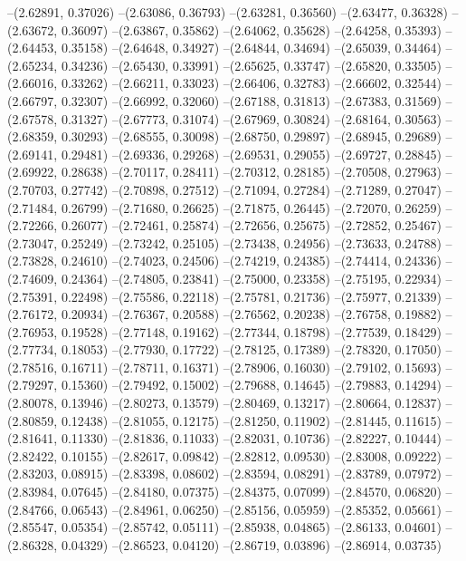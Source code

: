 --(2.62891, 0.37026)
--(2.63086, 0.36793)
--(2.63281, 0.36560)
--(2.63477, 0.36328)
--(2.63672, 0.36097)
--(2.63867, 0.35862)
--(2.64062, 0.35628)
--(2.64258, 0.35393)
--(2.64453, 0.35158)
--(2.64648, 0.34927)
--(2.64844, 0.34694)
--(2.65039, 0.34464)
--(2.65234, 0.34236)
--(2.65430, 0.33991)
--(2.65625, 0.33747)
--(2.65820, 0.33505)
--(2.66016, 0.33262)
--(2.66211, 0.33023)
--(2.66406, 0.32783)
--(2.66602, 0.32544)
--(2.66797, 0.32307)
--(2.66992, 0.32060)
--(2.67188, 0.31813)
--(2.67383, 0.31569)
--(2.67578, 0.31327)
--(2.67773, 0.31074)
--(2.67969, 0.30824)
--(2.68164, 0.30563)
--(2.68359, 0.30293)
--(2.68555, 0.30098)
--(2.68750, 0.29897)
--(2.68945, 0.29689)
--(2.69141, 0.29481)
--(2.69336, 0.29268)
--(2.69531, 0.29055)
--(2.69727, 0.28845)
--(2.69922, 0.28638)
--(2.70117, 0.28411)
--(2.70312, 0.28185)
--(2.70508, 0.27963)
--(2.70703, 0.27742)
--(2.70898, 0.27512)
--(2.71094, 0.27284)
--(2.71289, 0.27047)
--(2.71484, 0.26799)
--(2.71680, 0.26625)
--(2.71875, 0.26445)
--(2.72070, 0.26259)
--(2.72266, 0.26077)
--(2.72461, 0.25874)
--(2.72656, 0.25675)
--(2.72852, 0.25467)
--(2.73047, 0.25249)
--(2.73242, 0.25105)
--(2.73438, 0.24956)
--(2.73633, 0.24788)
--(2.73828, 0.24610)
--(2.74023, 0.24506)
--(2.74219, 0.24385)
--(2.74414, 0.24336)
--(2.74609, 0.24364)
--(2.74805, 0.23841)
--(2.75000, 0.23358)
--(2.75195, 0.22934)
--(2.75391, 0.22498)
--(2.75586, 0.22118)
--(2.75781, 0.21736)
--(2.75977, 0.21339)
--(2.76172, 0.20934)
--(2.76367, 0.20588)
--(2.76562, 0.20238)
--(2.76758, 0.19882)
--(2.76953, 0.19528)
--(2.77148, 0.19162)
--(2.77344, 0.18798)
--(2.77539, 0.18429)
--(2.77734, 0.18053)
--(2.77930, 0.17722)
--(2.78125, 0.17389)
--(2.78320, 0.17050)
--(2.78516, 0.16711)
--(2.78711, 0.16371)
--(2.78906, 0.16030)
--(2.79102, 0.15693)
--(2.79297, 0.15360)
--(2.79492, 0.15002)
--(2.79688, 0.14645)
--(2.79883, 0.14294)
--(2.80078, 0.13946)
--(2.80273, 0.13579)
--(2.80469, 0.13217)
--(2.80664, 0.12837)
--(2.80859, 0.12438)
--(2.81055, 0.12175)
--(2.81250, 0.11902)
--(2.81445, 0.11615)
--(2.81641, 0.11330)
--(2.81836, 0.11033)
--(2.82031, 0.10736)
--(2.82227, 0.10444)
--(2.82422, 0.10155)
--(2.82617, 0.09842)
--(2.82812, 0.09530)
--(2.83008, 0.09222)
--(2.83203, 0.08915)
--(2.83398, 0.08602)
--(2.83594, 0.08291)
--(2.83789, 0.07972)
--(2.83984, 0.07645)
--(2.84180, 0.07375)
--(2.84375, 0.07099)
--(2.84570, 0.06820)
--(2.84766, 0.06543)
--(2.84961, 0.06250)
--(2.85156, 0.05959)
--(2.85352, 0.05661)
--(2.85547, 0.05354)
--(2.85742, 0.05111)
--(2.85938, 0.04865)
--(2.86133, 0.04601)
--(2.86328, 0.04329)
--(2.86523, 0.04120)
--(2.86719, 0.03896)
--(2.86914, 0.03735)
